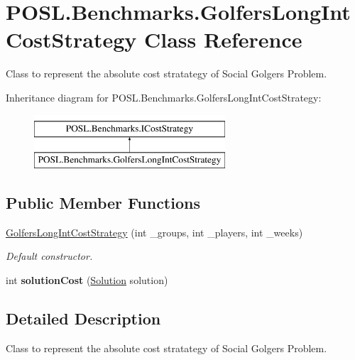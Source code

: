 \hypertarget{classPOSL_1_1Benchmarks_1_1GolfersLongIntCostStrategy}{}\section{P\+O\+S\+L.\+Benchmarks.\+Golfers\+Long\+Int\+Cost\+Strategy Class Reference}
\label{classPOSL_1_1Benchmarks_1_1GolfersLongIntCostStrategy}


Class to represent the absolute cost stratategy of Social Golgers Problem.  


Inheritance diagram for P\+O\+S\+L.\+Benchmarks.\+Golfers\+Long\+Int\+Cost\+Strategy\+:\begin{figure}[H]
\begin{center}
\leavevmode
\includegraphics[height=2.000000cm]{classPOSL_1_1Benchmarks_1_1GolfersLongIntCostStrategy}
\end{center}
\end{figure}
\subsection*{Public Member Functions}
\begin{DoxyCompactItemize}
\item 
\hyperlink{classPOSL_1_1Benchmarks_1_1GolfersLongIntCostStrategy_af920964103d2261bcd0da265c7f06a55}{Golfers\+Long\+Int\+Cost\+Strategy} (int \+\_\+groups, int \+\_\+players, int \+\_\+weeks)
\begin{DoxyCompactList}\small\item\em Default constructor. \end{DoxyCompactList}\item 
\mbox{\label{classPOSL_1_1Benchmarks_1_1GolfersLongIntCostStrategy_a44bd356a05ef5afcd158ba0e7b97a256}} 
int {\bfseries solution\+Cost} (\hyperlink{classPOSL_1_1Data_1_1Solution}{Solution} solution)
\end{DoxyCompactItemize}


\subsection{Detailed Description}
Class to represent the absolute cost stratategy of Social Golgers Problem. 

